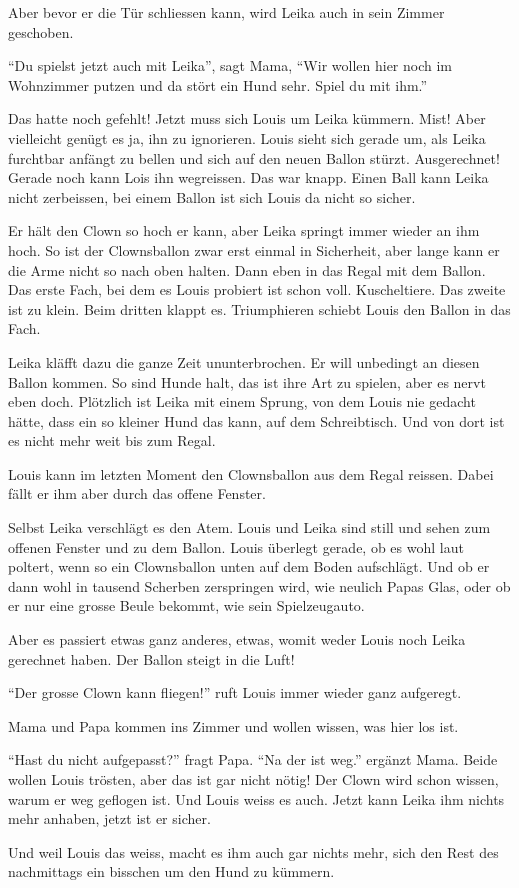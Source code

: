 Aber bevor er die Tür schliessen kann, wird Leika auch in sein Zimmer geschoben. 

\enquote{Du spielst jetzt auch mit Leika}, sagt Mama, \enquote{Wir wollen hier noch im Wohnzimmer putzen und da stört ein Hund sehr. Spiel du mit ihm.}

Das hatte noch gefehlt! Jetzt muss sich Louis um Leika kümmern. Mist! Aber vielleicht genügt es ja, ihn zu ignorieren. Louis sieht sich gerade um, als Leika furchtbar anfängt zu bellen und sich auf den neuen Ballon stürzt. Ausgerechnet! Gerade noch kann Lois ihn wegreissen. Das war knapp. Einen Ball kann Leika nicht zerbeissen, bei einem Ballon ist sich Louis da nicht so sicher.

Er hält den Clown so hoch er kann, aber Leika springt immer wieder an ihm hoch. So ist der Clownsballon zwar erst einmal in Sicherheit, aber lange kann er die Arme nicht so nach oben halten. Dann eben in das Regal mit dem Ballon. Das erste Fach, bei dem es Louis probiert ist schon voll. Kuscheltiere. Das zweite ist zu klein. Beim dritten klappt es. Triumphieren schiebt Louis den Ballon in das Fach.

Leika kläfft dazu die ganze Zeit ununterbrochen. Er will unbedingt an diesen Ballon kommen. So sind Hunde halt, das ist ihre Art zu spielen, aber es nervt eben doch. Plötzlich ist Leika mit einem Sprung, von dem Louis nie gedacht hätte, dass ein so kleiner Hund das kann, auf dem Schreibtisch. Und von dort ist es nicht mehr weit bis zum Regal. 

Louis kann im letzten Moment den Clownsballon aus dem Regal reissen. Dabei fällt er ihm aber durch das offene Fenster.

Selbst Leika verschlägt es den Atem. Louis und Leika sind still und sehen zum offenen Fenster und zu dem Ballon. Louis überlegt gerade, ob es wohl laut poltert, wenn so ein Clownsballon unten auf dem Boden aufschlägt. Und ob er dann wohl in tausend Scherben zerspringen wird, wie neulich Papas Glas, oder ob er nur eine grosse Beule bekommt, wie sein Spielzeugauto.

Aber es passiert etwas ganz anderes, etwas, womit weder Louis noch Leika gerechnet haben. Der Ballon steigt in die Luft!

\enquote{Der grosse Clown kann fliegen!} ruft Louis immer wieder ganz aufgeregt.

Mama und Papa kommen ins Zimmer und wollen wissen, was hier los ist.

\enquote{Hast du nicht aufgepasst?} fragt Papa. \enquote{Na der ist weg.} ergänzt Mama. Beide wollen Louis trösten, aber das ist gar nicht nötig! Der Clown wird schon wissen, warum er weg geflogen ist. Und Louis weiss es auch. Jetzt kann Leika ihm nichts mehr anhaben, jetzt ist er sicher.

Und weil Louis das weiss, macht es ihm auch gar nichts mehr, sich den Rest des nachmittags ein bisschen um den Hund zu kümmern.

 \hfill {\color{red}\decofourleft}
